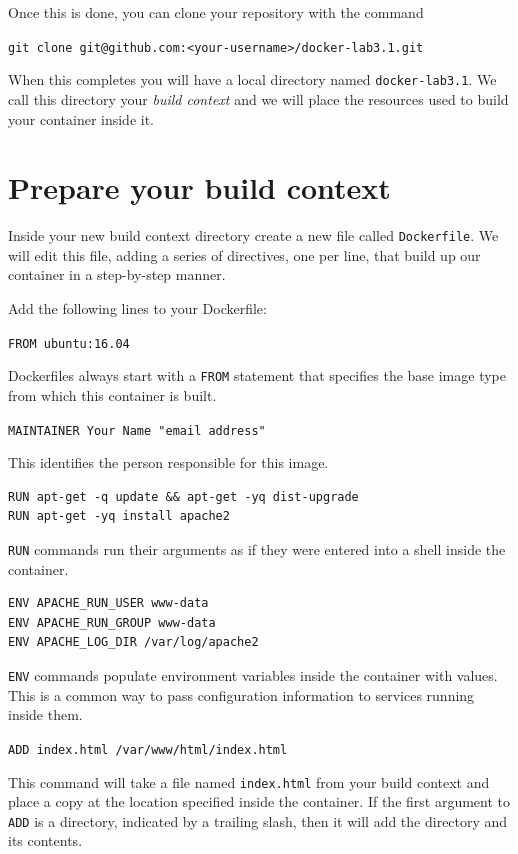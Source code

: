 \documentclass{article}
\begin{document}
Once this is done, you can clone your repository with the command

\texttt{git clone git@github.com:<your-username>/docker-lab3.1.git}

When this completes you will have a local directory named \texttt{docker-lab3.1}. We call this directory your \emph{build context} and we will place the resources used to build your container inside it.

\section{Prepare your build context}
Inside your new build context directory create a new file called \texttt{Dockerfile}. We will edit this file, adding a series of directives, one per line, that build up our container in a step-by-step manner.

Add the following lines to your Dockerfile:

\texttt{FROM ubuntu:16.04}

Dockerfiles always start with a \texttt{FROM} statement that specifies the base image type from which this container is built.

\texttt{MAINTAINER Your Name "email address"}

This identifies the person responsible for this image.

\begin{verbatim}
RUN apt-get -q update && apt-get -yq dist-upgrade
RUN apt-get -yq install apache2
\end{verbatim}

\texttt{RUN} commands run their arguments as if they were entered into a shell inside the container.

\begin{verbatim}
ENV APACHE_RUN_USER www-data
ENV APACHE_RUN_GROUP www-data
ENV APACHE_LOG_DIR /var/log/apache2
\end{verbatim}

\texttt{ENV} commands populate environment variables inside the container with values. This is a common way to pass configuration information to services running inside them.

\texttt{ADD index.html /var/www/html/index.html }

This command will take a file named \texttt{index.html} from your build context and place a copy at the location specified inside the container. If the first argument to \texttt{ADD} is a directory, indicated by a trailing slash, then it will add the directory and its contents.
\end{document}
